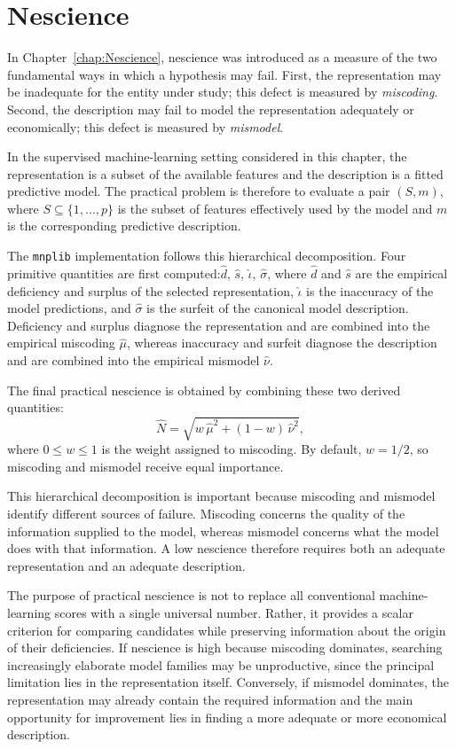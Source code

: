 %
%

\section{Nescience}
\label{sec:machine_learning_nescience}

In Chapter~\ref{chap:Nescience}, nescience was introduced as a measure of the two fundamental ways in which a hypothesis may fail. First, the representation may be inadequate for the entity under study; this defect is measured by \emph{miscoding}. Second, the description may fail to model the representation adequately or economically; this defect is measured by \emph{mismodel}.

In the supervised machine-learning setting considered in this chapter, the representation is a subset of the available features and the description is a fitted predictive model. The practical problem is therefore to evaluate a pair $(S,m)$, where $S\subseteq\{1,\ldots,p\}$ is the subset of features effectively used by the model and $m$ is the corresponding predictive description.

The \texttt{mnplib} implementation follows this hierarchical decomposition. Four primitive quantities are first computed:$\widehat d$, $\widehat s$, $\widehat \iota$, $\widehat \sigma$, where $\widehat d$ and $\widehat s$ are the empirical deficiency and surplus of the selected representation, $\widehat\iota$ is the inaccuracy of the model predictions, and $\widehat\sigma$ is the surfeit of the canonical model description. Deficiency and surplus diagnose the representation and are combined into the empirical miscoding $\widehat\mu$, whereas inaccuracy and surfeit diagnose the description and are combined into the empirical mismodel $\widehat\nu$.

The final practical nescience is obtained by combining these two derived quantities:
\[
\widehat N = \sqrt{w\,\widehat\mu^2 + (1-w)\,\widehat\nu^2},
\]
where $0\leq w\leq1$ is the weight assigned to miscoding. By default, $w=1/2$, so miscoding and mismodel receive equal importance.

This hierarchical decomposition is important because miscoding and mismodel identify different sources of failure. Miscoding concerns the quality of the information supplied to the model, whereas mismodel concerns what the model does with that information. A low nescience therefore requires both an adequate representation and an adequate description.

The purpose of practical nescience is not to replace all conventional machine-learning scores with a single universal number. Rather, it provides a scalar criterion for comparing candidates while preserving information about the origin of their deficiencies. If nescience is high because miscoding dominates, searching increasingly elaborate model families may be unproductive, since the principal limitation lies in the representation itself. Conversely, if mismodel dominates, the representation may already contain the required information and the main opportunity for improvement lies in finding a more adequate or more economical description.

